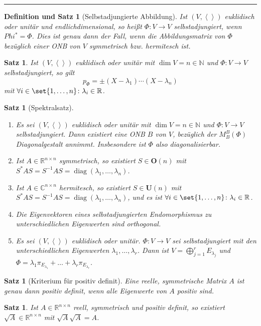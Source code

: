 \documentclass[a4paper]{article}
\newcounter{Sec}
\theoremstyle{marginbreak}
\newtheorem{satz}[definition]{Satz}
\newtheorem{defsatz}[definition]{Definition und Satz}
\DeclareMathOperator{\diag}{diag}
\newcommand{\sep}{%
	\rule{\textwidth}{0.3pt}%
	\stepcounter{Sec}%
	}
\newcommand\scp[1]{\left\langle#1\right\rangle}
\begin{document}
	\sep
	\begin{defsatz}[Selbstadjungierte Abbildung]
		Ist $(V,\scp{})$ euklidisch oder unitär und endlichdimensional, so heißt $\Phi\colon V\to V$ selbstadjungiert,
		wenn $Phi^*=\Phi$. Dies ist genau dann der Fall, wenn die Abbildungsmatrix von $\Phi$ bezüglich einer
		ONB von $V$ symmetrisch bzw. hermitesch ist.
	\end{defsatz}
	\begin{satz}
		Ist $(V, \scp{})$ euklidisch oder unitär mit $\dim V=n\in\mathbb{N}$ und $\Phi\colon V\to V$ selbstadjungiert,
		so gilt \[p_\Phi=\pm(X-\lambda_1)\cdots(X-\lambda_n)\] mit $\forall i\in\set{1,\ldots,n}\colon\lambda_i\in\mathbb{R}$.
	\end{satz}
	\begin{satz}[Spektralsatz]
		\begin{enumerate}[label=(\alph*)]
			\item Es sei $(V, \scp{})$ euklidisch oder unitär mit $\dim V=n\in\mathbb{N}$ und $\Phi\colon V\to V$ selbstadjungiert.
				Dann existiert eine ONB $B$ von $V$, bezüglich der $M_B^B(\Phi)$ Diagonalgestalt annimmt. Insbesondere ist $\Phi$
				also diagonalisierbar.
			\item Ist $A\in\mathbb{R}^{n\times n}$ symmetrisch, so existiert
				$S\in\mathbf{O}(n)$ mit $S^*AS=S^{-1}AS = \diag(\lambda_1,\ldots,\lambda_n)$.
			\item Ist $A\in\mathbb{C}^{n\times n}$ hermitesch, so existiert
				$S\in\mathbf{U}(n)$ mit $S^*AS=S^{-1}AS = \diag(\lambda_1,\ldots,\lambda_n)$,
				und es ist $\forall i\in\set{1,\ldots,n}\colon \lambda_i\in\mathbb{R}$.
			\item Die Eigenvektoren eines selbstadjungierten Endomorphismus zu unterschiedlichen
				Eigenwerten sind orthogonal.
			\item Es sei $(V,\scp{})$ euklidisch oder unitär. $\Phi\colon V\to V$ sei selbstadjungiert
				mit den unterschiedlichen Eigenwerten $\lambda_1,\ldots,\lambda_r$. Dann ist
				$V=\bigoplus_{j=1}^rE_{\lambda_j}$ und $\Phi = \lambda_1\pi_{E_{\lambda_1}}+\ldots+\lambda_r\pi_{E_{\lambda_r}}$.
		\end{enumerate}
	\end{satz}
	\begin{satz}[Kriterium für positiv definit]
		Eine reelle, symmetrische Matrix $A$ ist genau dann positiv definit, wenn alle
		Eigenwerte von $A$ positiv sind.
	\end{satz}
	\begin{satz}
		Ist $A\in\mathbb{R}^{n\times n}$ reell, symmetrisch und positiv definit,
		so existiert $\sqrt{A}\in\mathbb{R}^{n\times n}$ mit $\sqrt{A}\sqrt{A}=A$.
	\end{satz}
\end{document}
